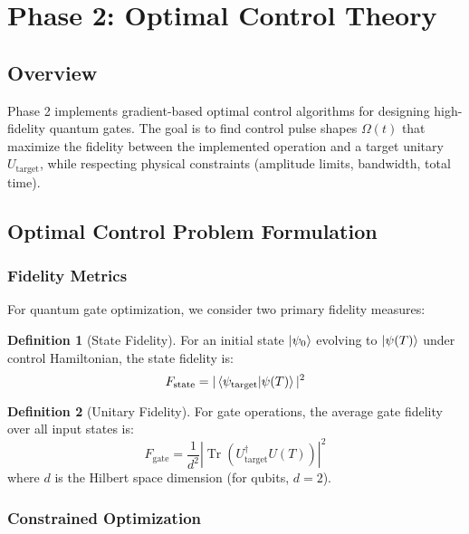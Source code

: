 \documentclass[11pt,a4paper]{article}
\theoremstyle{definition}
\newtheorem{definition}{Definition}[section]
\theoremstyle{remark}
\renewcommand{\Tr}{\operatorname{Tr}}
\begin{document}
\section{Phase 2: Optimal Control Theory}
\label{sec:phase2}

\subsection{Overview}

Phase 2 implements gradient-based optimal control algorithms for designing high-fidelity quantum gates. The goal is to find control pulse shapes $\Omega(t)$ that maximize the fidelity between the implemented operation and a target unitary $U_{\text{target}}$, while respecting physical constraints (amplitude limits, bandwidth, total time).

\subsection{Optimal Control Problem Formulation}

\subsubsection{Fidelity Metrics}

For quantum gate optimization, we consider two primary fidelity measures:

\begin{definition}[State Fidelity]
For an initial state $\ket{\psi_0}$ evolving to $\ket{\psi(T)}$ under control Hamiltonian, the state fidelity is:
\begin{equation}
F_{\text{state}} = |\braket{\psi_{\text{target}}}{\psi(T)}|^2
\end{equation}
\end{definition}

\begin{definition}[Unitary Fidelity]
For gate operations, the average gate fidelity over all input states is:
\begin{equation}
F_{\text{gate}} = \frac{1}{d^2}|\Tr(U_{\text{target}}^\dagger U(T))|^2
\end{equation}
where $d$ is the Hilbert space dimension (for qubits, $d=2$).
\end{definition}

\subsubsection{Constrained Optimization}
\end{document}
